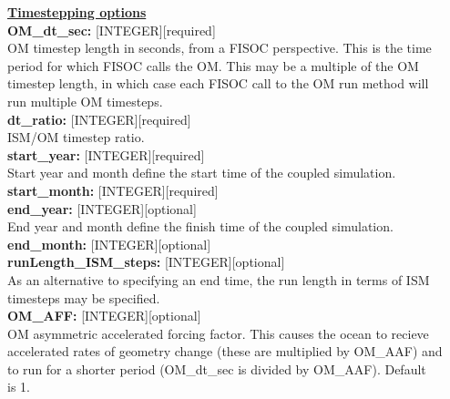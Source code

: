 \documentclass[11pt]{article}
\begin{document}
\begin{flushleft}
\textbf{\underline{Timestepping options}}                                  \\
\textbf{OM\_dt\_sec:}         [INTEGER][required]                          \\
OM timestep length in seconds, from a FISOC perspective.  This is the time \\
period for which FISOC calls the OM.  This may be a multiple of the OM     \\
timestep length, in which case each FISOC call to the OM run method will   \\
run multiple OM timesteps.                                                 \\
\vspace{6pt}
\textbf{dt\_ratio:}          [INTEGER][required]                           \\
ISM/OM timestep ratio.                                                     \\
\vspace{6pt}
\textbf{start\_year:}        [INTEGER][required]                           \\
Start year and month define the start time of the coupled simulation.      \\
\vspace{6pt}
\textbf{start\_month:}       [INTEGER][required]                           \\
\vspace{6pt}
\textbf{end\_year:}          [INTEGER][optional]                           \\
End year and month define the finish time of the coupled simulation.       \\
\vspace{6pt}
\textbf{end\_month:}         [INTEGER][optional]                           \\
\vspace{6pt}
\textbf{runLength\_ISM\_steps:} [INTEGER][optional]                        \\
As an alternative to specifying an end time, the run length in terms of 
ISM timesteps may be specified.                                            \\
\vspace{6pt}
\textbf{OM\_AFF:}            [INTEGER][optional]                           \\
OM asymmetric accelerated forcing factor.  This causes the ocean to recieve\\
accelerated rates of geometry change (these are multiplied by OM\_AAF) and \\
to run for a shorter period (OM\_dt\_sec is divided by OM\_AAF). Default   \\
is 1.                                                                      \\
\vspace{22pt}


\end{flushleft}
\end{document}
